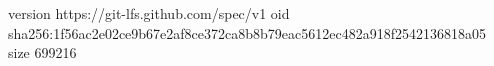 version https://git-lfs.github.com/spec/v1
oid sha256:1f56ac2e02ce9b67e2af8ce372ca8b8b79eac5612ec482a918f2542136818a05
size 699216
